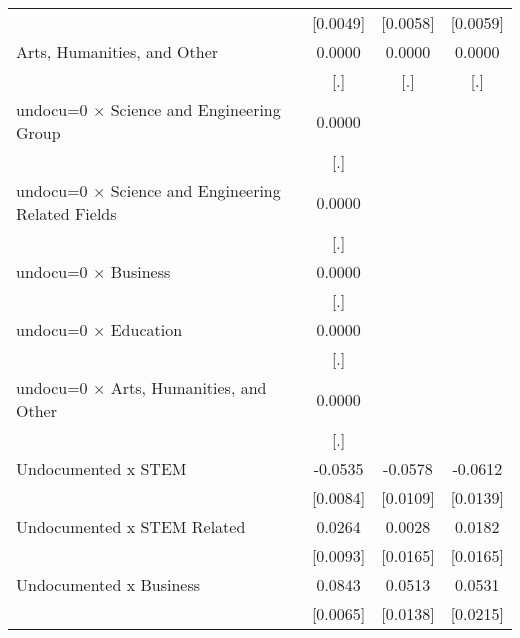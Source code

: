 \begin{table}[htbp]
\begin{tabular}{l*{3}{c}}
                    &    [0.0049]         &    [0.0058]         &    [0.0059]         \\
\addlinespace
Arts, Humanities, and Other&      0.0000         &      0.0000         &      0.0000         \\
                    &         [.]         &         [.]         &         [.]         \\
\addlinespace
undocu=0 $\times$ Science and Engineering Group&      0.0000         &                     &                     \\
                    &         [.]         &                     &                     \\
\addlinespace
undocu=0 $\times$ Science and Engineering Related Fields&      0.0000         &                     &                     \\
                    &         [.]         &                     &                     \\
\addlinespace
undocu=0 $\times$ Business&      0.0000         &                     &                     \\
                    &         [.]         &                     &                     \\
\addlinespace
undocu=0 $\times$ Education&      0.0000         &                     &                     \\
                    &         [.]         &                     &                     \\
\addlinespace
undocu=0 $\times$ Arts, Humanities, and Other&      0.0000         &                     &                     \\
                    &         [.]         &                     &                     \\
\addlinespace
Undocumented x STEM &     -0.0535\sym{***}&     -0.0578\sym{***}&     -0.0612\sym{***}\\
                    &    [0.0084]         &    [0.0109]         &    [0.0139]         \\
\addlinespace
Undocumented x STEM Related&      0.0264\sym{***}&      0.0028         &      0.0182         \\
                    &    [0.0093]         &    [0.0165]         &    [0.0165]         \\
\addlinespace
Undocumented x Business&      0.0843\sym{***}&      0.0513\sym{***}&      0.0531\sym{**} \\
                    &    [0.0065]         &    [0.0138]         &    [0.0215]         \\

\end{tabular}
\end{table}
